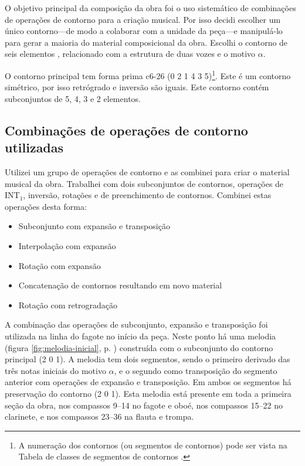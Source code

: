 O objetivo principal da composição da obra \obra{} foi o uso
sistemático de combinações de operações de contorno para a criação
musical. Por isso decidi escolher um único contorno---de modo a
colaborar com a unidade da peça---e manipulá-lo para gerar a maioria
do material composicional da obra. Escolhi o contorno de seis
elementos \contpr{}, relacionado com a estrutura de duas vozes e o
motivo $\alpha$.

O contorno principal \contpr{} tem forma prima c6-26 (0 2 1 4 3
5)\footnote{A numeração dos contornos (ou segmentos de contornos) pode
  ser vista na Tabela de classes de segmentos de contornos
  \cite{marvin.ea87:relating}.}. Este é um contorno simétrico, por
isso retrógrado e inversão são iguais. Este contorno contém
subconjuntos de 5, 4, 3 e 2 elementos.

\subsection{Combinações de operações de contorno utilizadas}
\label{sec:comb-de-oper}

Utilizei um grupo de operações de contorno e as combinei para criar o
material musical da obra. Trabalhei com dois subconjuntos de
contornos, operações de INT$_1$, inversão, rotações e de preenchimento
de contornos. Combinei estas operações desta forma:

\begin{itemize}
\item Subconjunto com expansão e transposição
\item Interpolação com expansão
\item Rotação com expansão
\item Concatenação de contornos resultando em novo material
\item Rotação com retrogradação
\end{itemize}




A combinação das operações de subconjunto, expansão e transposição foi
utilizada na linha do fagote no início da peça. Neste ponto há uma
melodia (figura \ref{fig:melodia-inicial},
p. \pageref{fig:melodia-inicial}) construída com o subconjunto do
contorno principal (2 0 1). A melodia tem dois segmentos, sendo o
primeiro derivado das três notas iniciais do motivo $\alpha$, e o
segundo como transposição do segmento anterior com operações de
expansão e transposição. Em ambos os segmentos há preservação do
contorno (2 0 1). Esta melodia está presente em toda a primeira seção
da obra, nos compassos 9--14 no fagote e oboé, nos compassos 15--22 no
clarinete, e nos compassos 23--36 na flauta e trompa.

